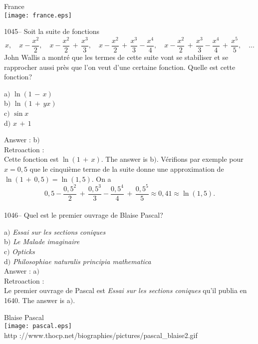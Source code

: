 ﻿\documentclass[letterpaper, 12pt]{article}
\begin{document}
        \begin{center}
        France\\
    \texttt{[image: france.eps]}\\
    \end{center}

1045-- Soit la suite de fonctions
$$\displaystyle{x,\quad x-\frac{x^2}2,\quad
x-\frac{x^2}2\,+\,\frac{x^3}3,\quad
x-\frac{x^2}2\,+\,\frac{x^3}3-\frac{x^4}4,\quad
x-\frac{x^2}2\,+\,\frac{x^3}3-\frac{x^4}4\,+\,\frac{x^5}5,\quad\ldots}$$
John Wallis a montr\'e que les termes de cette suite vont se
stabiliser et se rapprocher aussi pr\`es que l'on veut d'une
certaine fonction. Quelle est cette fonction?

a$)$ $\ln(1\,-\,x)$ \\
b$)$ $\ln(1\,+\,yx)$  \\
c$)$ $\sin x$  \\
d$)$ $x\,+\,1$

Answer : b$)$\\

Retroaction : \\
Cette fonction est $\ln(1\,+\,x)$. The answer is b$)$.
V\'erifions par exemple pour $x=0,5$ que le cinqui\`eme terme de la
suite donne une approximation de $\ln(1\,+\,0,5)=\ln(1,5)$. On a
$$0,5-\frac{0,5^2}2\,+\,\frac{0,5^3}3-\frac{0,5^4}4\,+\,\frac{0,5^5}5\approx0,41\approx\ln(1,5).$$
\\

1046-- Quel est le premier ouvrage de Blaise Pascal?

a$)$ {\sl Essai sur les sections coniques} \\
b$)$ {\sl Le Malade imaginaire}  \\
c$)$ {\sl Opticks}  \\
d$)$ {\sl Philosophiae naturalis principia mathematica}\\

Answer : a$)$\\

Retroaction : \\
Le premier ouvrage de Pascal est {\sl Essai sur les sections
coniques} qu'il publia en 1640. The answer is a$)$.

        \begin{center}
        Blaise Pascal\\
    \texttt{[image: pascal.eps]}\\
        {\footnotesize http
://www.thocp.net/biographies/pictures/pascal\_blaise2.gif}
    \end{center}
\end{document}
